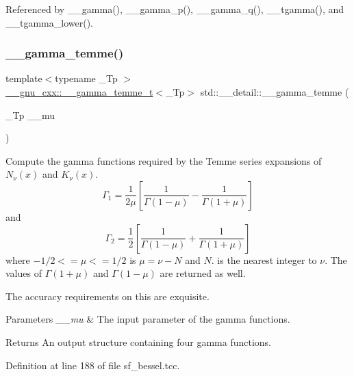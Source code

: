 Referenced by \+\_\+\+\_\+gamma(), \+\_\+\+\_\+gamma\+\_\+p(), \+\_\+\+\_\+gamma\+\_\+q(), \+\_\+\+\_\+tgamma(), and \+\_\+\+\_\+tgamma\+\_\+lower().

\mbox{\label{namespacestd_1_1____detail_a0d4fa90f527fd05d057b27ba0366488a}} 
\subsubsection{\texorpdfstring{\+\_\+\+\_\+gamma\+\_\+temme()}{\_\_gamma\_temme()}}
{\footnotesize\ttfamily template$<$typename \+\_\+\+Tp $>$ \\
\hyperlink{struct____gnu__cxx_1_1____gamma__temme__t}{\+\_\+\+\_\+gnu\+\_\+cxx\+::\+\_\+\+\_\+gamma\+\_\+temme\+\_\+t}$<$\+\_\+\+Tp$>$ std\+::\+\_\+\+\_\+detail\+::\+\_\+\+\_\+gamma\+\_\+temme (\begin{DoxyParamCaption}\item[{\+\_\+\+Tp}]{\+\_\+\+\_\+mu }\end{DoxyParamCaption})}



Compute the gamma functions required by the Temme series expansions of $ N_\nu(x) $ and $ K_\nu(x) $. \[ \Gamma_1 = \frac{1}{2\mu} \left[\frac{1}{\Gamma(1 - \mu)} - \frac{1}{\Gamma(1 + \mu)}\right] \] and \[ \Gamma_2 = \frac{1}{2} \left[\frac{1}{\Gamma(1 - \mu)} + \frac{1}{\Gamma(1 + \mu)}\right] \] where $ -1/2 <= \mu <= 1/2 $ is $ \mu = \nu - N $ and $ N $. is the nearest integer to $ \nu $. The values of $ \Gamma(1 + \mu) $ and $ \Gamma(1 - \mu) $ are returned as well. 

The accuracy requirements on this are exquisite.


\begin{DoxyParams}{Parameters}
{\em \+\_\+\+\_\+mu} & The input parameter of the gamma functions. \\
\hline
\end{DoxyParams}
\begin{DoxyReturn}{Returns}
An output structure containing four gamma functions. 
\end{DoxyReturn}


Definition at line 188 of file sf\+\_\+bessel.\+tcc.




